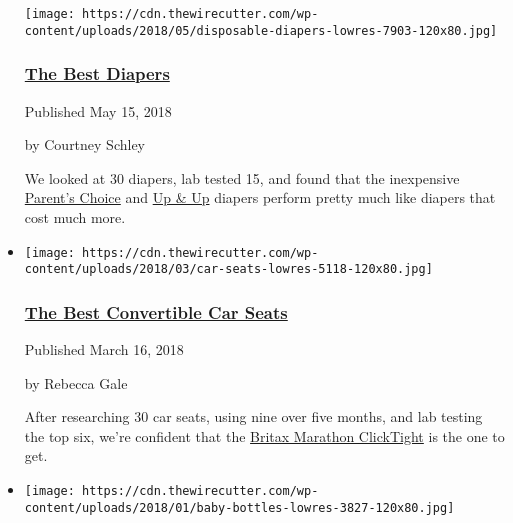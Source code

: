 \begin{itemize}
  \texttt{[image: https://cdn.thewirecutter.com/wp-content/uploads/2018/05/disposable-diapers-lowres-7903-120x80.jpg]}

  \hypertarget{the-best-diapers}{%
  \subsubsection{\texorpdfstring{\href{https://www.nytimes3xbfgragh.onion/wirecutter/reviews/best-diapers/}{The
  Best Diapers}}{The Best Diapers}}\label{the-best-diapers}}

  Published May 15, 2018

  by Courtney Schley

  We looked at 30 diapers, lab tested 15, and found that the inexpensive
  \href{https://www.nytimes3xbfgragh.onion/wirecutter/out/link/26559/0/4/75168/}{Parent's
  Choice} and
  \href{https://www.nytimes3xbfgragh.onion/wirecutter/out/link/26560/0/4/75169/}{Up
  \& Up} diapers perform pretty much like diapers that cost much more.
\item
  \href{https://www.nytimes3xbfgragh.onion/wirecutter/reviews/best-convertible-car-seats/}{}

  \texttt{[image: https://cdn.thewirecutter.com/wp-content/uploads/2018/03/car-seats-lowres-5118-120x80.jpg]}

  \hypertarget{the-best-convertible-car-seats}{%
  \subsubsection{\texorpdfstring{\href{https://www.nytimes3xbfgragh.onion/wirecutter/reviews/best-convertible-car-seats/}{The
  Best Convertible Car
  Seats}}{The Best Convertible Car Seats}}\label{the-best-convertible-car-seats}}

  Published March 16, 2018

  by Rebecca Gale

  After researching 30 car seats, using nine over five months, and lab
  testing the top six, we're confident that the
  \href{https://www.nytimes3xbfgragh.onion/wirecutter/out/link/25415/152169/4/72408/?merchant=Bed\%20Bath\%20\%26\%20Beyond}{Britax
  Marathon ClickTight} is the one to get.
\item
  \href{https://www.nytimes3xbfgragh.onion/wirecutter/reviews/best-baby-bottles-and-bottle-brush/}{}

  \texttt{[image: https://cdn.thewirecutter.com/wp-content/uploads/2018/01/baby-bottles-lowres-3827-120x80.jpg]}


\end{itemize}
